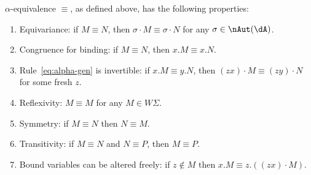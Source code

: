 \documentclass{book}
\def\sig{\Sigma}
\begin{document}
\begin{lem}\label{thm:alpha-adm}
  $\alpha$-equivalence $\equiv$, as defined above, has the following properties:
  \begin{enumerate}
  \item Equivariance: if $M\equiv N$, then $\sigma\cdot M \equiv \sigma \cdot N$ for any $\sigma\in \nAut(\dA)$.\label{item:alpha-eqvadm}
  \item Congruence for binding: if $M\equiv N$, then $x.M\equiv x.N$.\label{item:alpha-bindadm}
  \item Rule~\eqref{eq:alpha-gen} is invertible: if $x.M\equiv y.N$, then $(zx)\cdot M \equiv (zy)\cdot N$ for some fresh $z$.\label{item:alpha-gen-inv}
  \item Reflexivity: $M\equiv M$ for any $M\in W\sig$.\label{item:alpha-refl}
  \item Symmetry: if $M\equiv N$ then $N\equiv M$.\label{item:alpha-symm}
  \item Transitivity: if $M\equiv N$ and $N\equiv P$, then $M\equiv P$.\label{item:alpha-trans}
  \item Bound variables can be altered freely: if $z\notin M$ then $x.M \equiv z.((zx)\cdot M)$.\label{item:alpha-rename}
  \end{enumerate}
\end{lem}
\end{document}
